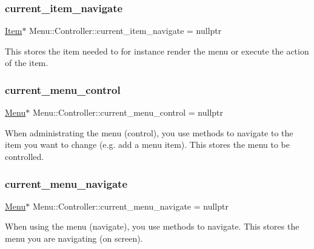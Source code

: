 \subsubsection{\texorpdfstring{current\+\_\+item\+\_\+navigate}{current\_item\_navigate}}
{\footnotesize\ttfamily \hyperlink{struct_menu_1_1_item}{Item}$\ast$ Menu\+::\+Controller\+::current\+\_\+item\+\_\+navigate = nullptr\hspace{0.3cm}{\ttfamily [private]}}

This stores the item needed to for instance render the menu or execute the action of the item. \hypertarget{class_menu_1_1_controller_a912ad4ad6b2c30e7cddf44547585a909}{}\label{class_menu_1_1_controller_a912ad4ad6b2c30e7cddf44547585a909} 
\subsubsection{\texorpdfstring{current\+\_\+menu\+\_\+control}{current\_menu\_control}}
{\footnotesize\ttfamily \hyperlink{struct_menu_1_1_menu}{Menu}$\ast$ Menu\+::\+Controller\+::current\+\_\+menu\+\_\+control = nullptr\hspace{0.3cm}{\ttfamily [private]}}

When administrating the menu (control), you use methods to navigate to the item you want to change (e.\+g. add a menu item). This stores the menu to be controlled. \hypertarget{class_menu_1_1_controller_a66ffabf19a4423ccca536762f0b9df88}{}\label{class_menu_1_1_controller_a66ffabf19a4423ccca536762f0b9df88} 
\subsubsection{\texorpdfstring{current\+\_\+menu\+\_\+navigate}{current\_menu\_navigate}}
{\footnotesize\ttfamily \hyperlink{struct_menu_1_1_menu}{Menu}$\ast$ Menu\+::\+Controller\+::current\+\_\+menu\+\_\+navigate = nullptr\hspace{0.3cm}{\ttfamily [private]}}

When using the menu (navigate), you use methods to navigate. This stores the menu you are navigating (on screen). \hypertarget{class_menu_1_1_controller_a80d614a66d1ffa2612688776842f1f31}{}\label{class_menu_1_1_controller_a80d614a66d1ffa2612688776842f1f31} 
